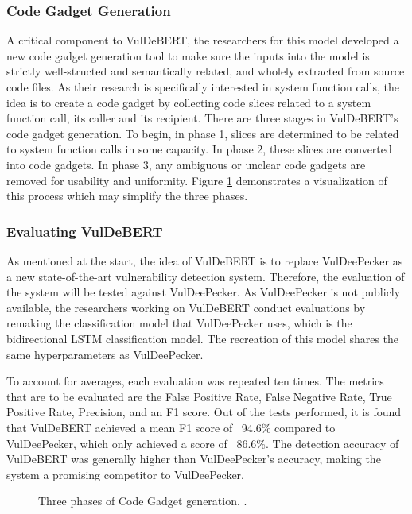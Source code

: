 \documentclass[12pt,twocolumn,letterpaper]{article}
\begin{document}
\subsubsection{Code Gadget Generation}
A critical component to VulDeBERT, the researchers for this model developed a new code gadget generation tool to
make sure the inputs into the model is strictly well-structed and semantically related, and wholely extracted from source code files.
As their research is specifically interested in system function calls, the idea is to create a code gadget by collecting
code slices related to a system function call, its caller and its recipient. There are three stages in VulDeBERT's code gadget generation.
To begin, in phase 1, slices are determined to be related to system function calls in some capacity. In phase 2, these slices are
converted into code gadgets. In phase 3, any ambiguous or unclear code gadgets are removed for usability and uniformity. 
Figure \ref{fig:af-4} demonstrates a visualization of this process which may simplify the three phases.

\subsubsection{Evaluating VulDeBERT}
As mentioned at the start, the idea of VulDeBERT is to replace VulDeePecker as a new state-of-the-art vulnerability detection system. Therefore, the evaluation of the system will be
tested against VulDeePecker. As VulDeePecker is not publicly available, the researchers working on VulDeBERT conduct evaluations by remaking the classification model that
VulDeePecker uses, which is the bidirectional LSTM classification model. The recreation of this model shares the same hyperparameters as VulDeePecker.

To account for averages, each evaluation was repeated ten times. The metrics that are to be evaluated are the False Positive Rate, False Negative Rate, True
Positive Rate, Precision, and an F1 score. Out of the tests performed, it is found that VulDeBERT achieved a mean F1 score of ~94.6\% compared to VulDeePecker, which only achieved a score of ~86.6\%. The detection accuracy of VulDeBERT was generally higher than VulDeePecker's accuracy, making the system a promising competitor
to VulDeePecker.

\begin{figure}[h!]
    \centering
    \caption{Three phases of Code Gadget generation. \cite{Kim22}.}
    \label{fig:af-4}
\end{figure}
\end{document}
